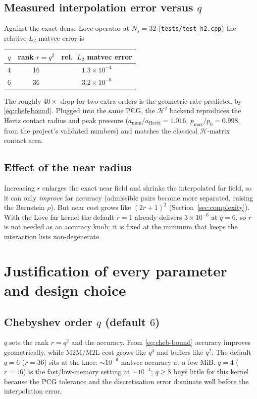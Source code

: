 \documentclass[11pt,a4paper]{article}
\newcommand{\Htwo}{\mathcal{H}^2}
\newcommand{\Hmat}{\mathcal{H}}
\newcommand{\code}[1]{\texttt{#1}}
\theoremstyle{definition}
\theoremstyle{remark}
\begin{document}
\subsection{Measured interpolation error versus $q$}

Against the exact dense Love operator at $N_s=32$
(\code{tests/test\_h2.cpp}) the relative $L_2$ matvec error is
\begin{center}
\begin{tabular}{ccc}
\toprule
$q$ & rank $r=q^2$ & rel.\ $L_2$ matvec error \\
\midrule
4 & 16 & $1.3\times10^{-4}$ \\
6 & 36 & $3.2\times10^{-6}$ \\
\bottomrule
\end{tabular}
\end{center}
The roughly $40\times$ drop for two extra orders is the geometric rate predicted
by \eqref{eq:cheb-bound}. Plugged into the same PCG, the $\Htwo$ backend
reproduces the Hertz contact radius and peak pressure
($a_{\text{num}}/a_{\text{Hertz}}=1.016$, $p_{\max}/p_0=0.998$, from the
project's validated numbers) and matches the classical $\Hmat$-matrix contact
area.

\subsection{Effect of the near radius}

Increasing $r$ enlarges the exact near field and shrinks the interpolated far
field, so it can only \emph{improve} far accuracy (admissible pairs become more
separated, raising the Bernstein $\rho$). But near cost grows like $(2r+1)^2$
(Section~\ref{sec:complexity}). With the Love far kernel the default $r=1$ already
delivers $3\times10^{-6}$ at $q=6$, so $r$ is not needed as an accuracy knob; it
is fixed at the minimum that keeps the interaction lists non-degenerate.

\section{Justification of every parameter and design choice}
\label{sec:params}

\subsection{Chebyshev order $q$ (default $6$)}
$q$ sets the rank $r=q^2$ and the accuracy. From \eqref{eq:cheb-bound} accuracy
improves geometrically, while M2M/M2L cost grows like $q^4$ and buffers like
$q^2$. The default $q=6$ ($r=36$) sits at the knee: $\sim10^{-6}$ matvec accuracy
at a few MiB. $q=4$ ($r=16$) is the fast/low-memory setting at $\sim10^{-4}$;
$q\ge8$ buys little for this kernel because the PCG tolerance and the discretisation
error dominate well before the interpolation error.
\end{document}
